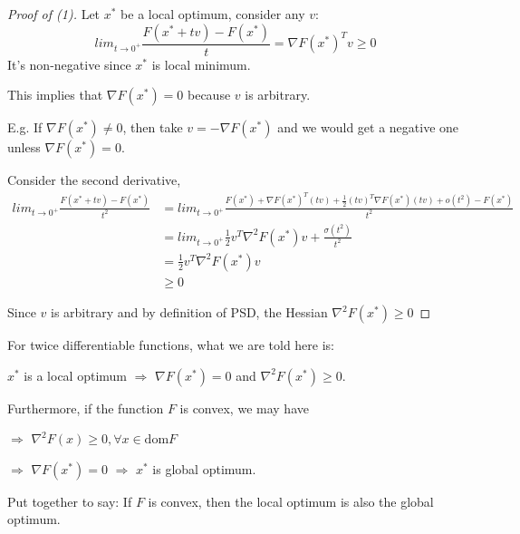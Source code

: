 \begin{proof}[Proof of (1)]
	Let $x^*$ be a local optimum, consider any $v$:
	\begin{equation*}
	lim_{t\rightarrow 0^+}\frac{F(x^* + tv) - F(x^*)}{t} = \nabla F(x^*)^Tv\geq 0
	\end{equation*}
	It's non-negative since $x^*$ is local minimum.
	
	This implies that $\nabla F(x^*) = 0$ because $v$ is arbitrary. 
	
	E.g. If $\nabla F(x^*) \neq 0$, then take $v = -\nabla F(x^*)$ and we would get a negative one unless $\nabla F(x^*) = 0.$
	
Consider the second derivative,
\begin{align*}
lim_{t\rightarrow 0^+}\frac{F(x^* + tv) - F(x^*)}{t^2} &= lim_{t\rightarrow 0^+} \frac{F(x^*) + \nabla F(x^*)^T(tv) + \frac{1}{2}(tv)^T\nabla F(x^*)(tv) + o(t^2) - F(x^*)}{t^2}\\
&= lim_{t\rightarrow 0^+} \frac{1}{2}v^T\nabla^2F(x^*)v+\frac{\sigma(t^2)}{t^2}\\
&= \frac{1}{2}v^T\nabla^2F(x^*)v \\
&\geq 0
\end{align*}

Since $v$ is arbitrary and by definition of PSD, the Hessian $\nabla^2 F(x^*) \geq 0$

\end{proof}

For twice differentiable functions, what we are told here is: 

$x^*$ is a local optimum $\Rightarrow$ $\nabla F(x^*) = 0$ and $\nabla^2F(x^*)\geq 0$.

Furthermore, if the function $F$ is convex, we may have

$\Rightarrow$ $\nabla^2F(x)\geq0, \forall x\in \text{dom}F$

$\Rightarrow$ $\nabla F(x^*) = 0$ $\Rightarrow$ $x^*$ is global optimum.

Put together to say: If $F$ is convex, then the local optimum is also the global optimum.\\

\vspace{0.3cm}

